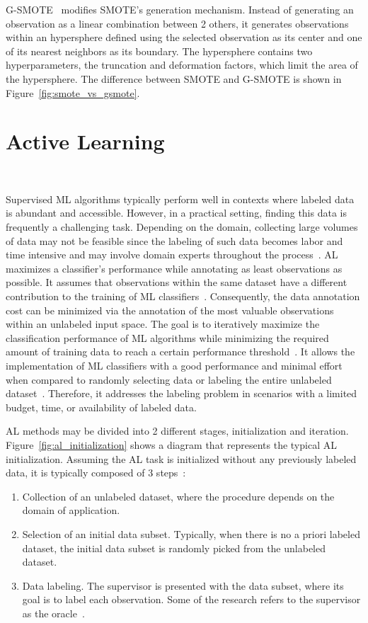 G-SMOTE~\cite{Douzas2019} modifies SMOTE's generation mechanism. Instead of
generating an observation as a linear combination between 2 others, it
generates observations within an hypersphere defined using the selected
observation as its center and one of its nearest neighbors as its boundary.
The hypersphere contains two hyperparameters, the truncation and deformation
factors, which limit the area of the hypersphere. The difference between SMOTE
and G-SMOTE is shown in Figure~\ref{fig:smote_vs_gsmote}.

\section{Active Learning}~\label{sec:active_learning}

Supervised ML algorithms typically perform well in contexts where labeled data
is abundant and accessible. However, in a practical setting, finding this data
is frequently a challenging task. Depending on the domain, collecting large
volumes of data may not be feasible since the labeling of such data becomes
labor and time intensive and may involve domain experts throughout the
process~\cite{Cao2020}. AL maximizes a classifier's performance while
annotating as least observations as possible. It assumes that observations
within the same dataset have a different contribution to the training of ML
classifiers~\cite{Ren2021}. Consequently, the data annotation cost can be
minimized via the annotation of the most valuable observations within an
unlabeled input space. The goal is to iteratively maximize the classification
performance of ML algorithms while minimizing the required amount of training
data to reach a certain performance threshold~\cite{Shrivastava2021}. It
allows the implementation of ML classifiers with a good performance and
minimal effort when compared to randomly selecting data or labeling the entire
unlabeled dataset~\cite{Ren2021}. Therefore, it addresses the labeling problem
in scenarios with a limited budget, time, or availability of labeled data. 

AL methods may be divided into 2 different stages, initialization and
iteration. Figure~\ref{fig:al_initialization} shows a diagram that represents
the typical AL initialization. Assuming the AL task is initialized without any
previously labeled data, it is typically composed of 3
steps~\cite{Fonseca2021}: 

\begin{enumerate}
    \item Collection of an unlabeled dataset, where the procedure depends on
        the domain of application.
    \item Selection of an initial data subset. Typically, when there is no a
        priori labeled dataset, the initial data subset is randomly picked
        from the unlabeled dataset.
    \item Data labeling. The supervisor is presented with the data subset,
        where its goal is to label each observation. Some of the research
        refers to the supervisor as the oracle~\cite{Yoo2019, Aghdam2019}.
\end{enumerate}

